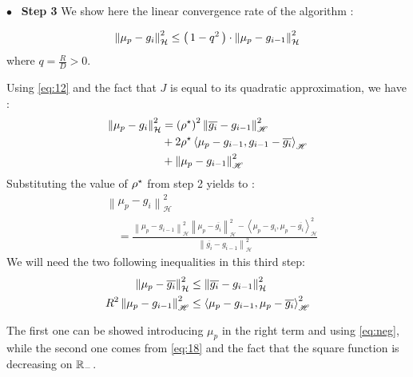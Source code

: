 {$\bullet$~\normalfont\bfseries\color{myorange!90!black} Step 3 } We show here
 the linear convergence rate of the algorithm :
 \begin{boxtheorem}
\begin{equation}
  \label{eq:rec}
  \norme{\mu_p-g_i}^2 \leq \prt{1-q^2}\cdot \norme{\mu_p-g_{i-1}}^2
\end{equation}
where $q = \frac{R}{D}>0$.
 \end{boxtheorem}

Using \eqref{eq:12} and the fact that $J$ is equal to its quadratic approximation, we have :
\begin{align*}
  \norme{\mu_p-g_i}^2
  &= \left( \ropt \right) ^ { 2 } \left\| \overline{g_i}-g_{i-1} \right\|_{ \mathscr { H }} ^ { 2 } \\&+ 2 \ropt \left\langle \mu_p-g_{i-1} , g_{i-1}-\overline{g_i} \right\rangle_{ \mathscr { H }} \\&+ \left\| \mu_p-g_{i-1} \right\|_{ \mathscr { H }} ^ { 2 }
\end{align*}
Substituting the value of $\ropt$ from step 2 yields to :
\begin{align*}
&\left\| \mu_p-g_i \right\|_{ \mathscr { H }} ^ { 2 } \\ &\quad= \frac { \left\| \mu_p-g_{i-1} \right\|_{ \mathscr { H }} ^ { 2 } \left\| \mu_p-\overline{g_i} \right\|_{ \mathscr { H }} ^ { 2 } - \left\langle \mu_p-g_i , \mu_p-\overline{g_i} \right\rangle_{ \mathscr { H }} ^ { 2 } } { \left\| \overline{g_i}-g_{i-1} \right\|_{ \mathscr { H }} ^ { 2 } }
\end{align*}
We will need the two following inequalities in this third step:
\begin{align}
  \norme{\mu_p-\overline{g_i}}^2 &\leq \norme{\overline{g_i}-g_{i-1}}^2\\
  R^2 \left\| \mu _ { p } - g _ { i - 1 } \right\| _ { \mathscr { H } }^2 &\leq
  \left\langle \mu _ { p } - g _ { i - 1 } , \mu _ { p } - \overline { g _ { i } } \right\rangle _ { \mathscr { H } }^2
\end{align}

The first one can be showed introducing $\mu_p$ in the right term and using
 \eqref{eq:neg}, while the second one comes from \eqref{eq:18} and the fact that
 the square function is decreasing on $\mathbb{R}_{-}$.

